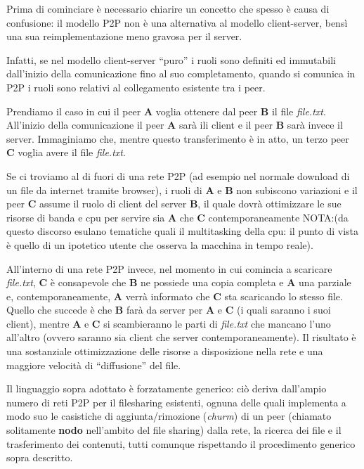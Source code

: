 Prima di cominciare è necessario chiarire un concetto che spesso è causa di confusione: il modello P2P non è una alternativa al modello client-server, bensì una sua reimplementazione meno gravosa per il server.

Infatti, se nel modello client-server ``puro'' i ruoli sono definiti ed immutabili dall'inizio della comunicazione fino al suo completamento, quando si comunica in P2P i ruoli sono relativi al collegamento esistente tra i peer.

Prendiamo il caso in cui il peer \textbf{A} voglia ottenere dal peer \textbf{B} il file \emph{file.txt}. All'inizio della comunicazione il peer \textbf{A} sarà ili client e il peer \textbf{B} sarà invece il server. Immaginiamo che, mentre questo transferimento è in atto, un terzo peer \textbf{C} voglia avere il file \emph{file.txt}.

Se ci troviamo al di fuori di una rete P2P (ad esempio nel normale download di un file da internet tramite browser), i ruoli di \textbf{A} e \textbf{B} non subiscono variazioni e il peer \textbf{C} assume il ruolo di client del server \textbf{B}, il quale dovrà ottimizzare le sue risorse di banda e cpu per servire sia \textbf{A} che \textbf{C} contemporaneamente NOTA:(da questo discorso esulano tematiche quali il multitasking della cpu: il punto di vista è quello di un ipotetico utente che osserva la macchina in tempo reale).

All'interno di una rete P2P invece, nel momento in cui comincia a scaricare \emph{file.txt}, \textbf{C} è consapevole che \textbf{B} ne possiede una copia completa e \textbf{A} una parziale e, contemporaneamente, \textbf{A} verrà informato che \textbf{C} sta scaricando lo stesso file. Quello che succede è che \textbf{B} farà da server per \textbf{A} e \textbf{C} (i quali saranno i suoi client), mentre \textbf{A} e \textbf{C} si scambieranno le parti di \emph{file.txt} che mancano l'uno all'altro (ovvero saranno sia client che server contemporaneamente). Il risultato è una sostanziale ottimizzazione delle risorse a disposizione nella rete e una maggiore velocità di ``diffusione'' del file.

Il linguaggio sopra adottato è forzatamente generico: ciò deriva dall'ampio numero di reti P2P per il filesharing esistenti, ognuna delle quali implementa a modo suo le casistiche di aggiunta/rimozione (\emph{churm}) di un peer (chiamato solitamente \textbf{nodo} nell'ambito del file sharing) dalla rete, la ricerca dei file e il trasferimento dei contenuti, tutti comunque rispettando il procedimento generico sopra descritto.


